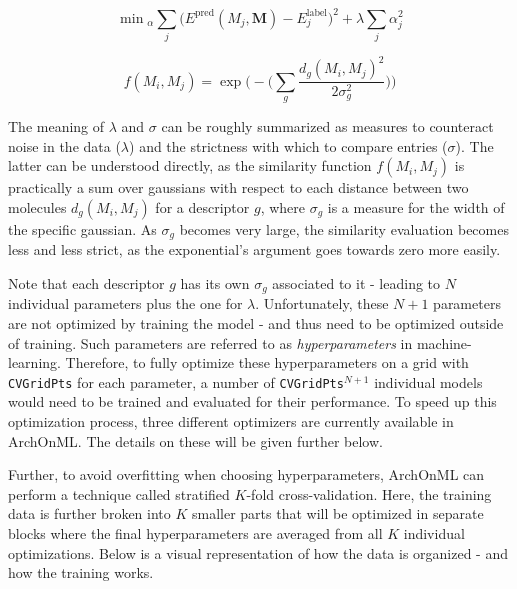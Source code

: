 \documentclass[12pt]{achemso}
\begin{document}
\begin{equation}
    \min \phantom{}_\alpha \sum\limits_{j} \big( E^\mathrm{pred}(M_j, \mathbf{M}) - E_j^\mathrm{label} \big)^2 + \lambda \sum\limits_{j} \alpha_j^2
\end{equation}

\begin{equation}
    f(M_i, M_j) = \exp \Bigg(-\Bigg( \sum\limits_{g} \frac{d_g(M_i, M_j)^2}{2 \sigma_g^2}\Bigg)\Bigg)
\end{equation}

\noindent The meaning of $\lambda$ and $\sigma$ can be roughly summarized as measures to counteract noise in the data ($\lambda$) and the strictness with which to compare entries ($\sigma$). The latter can be understood directly, as the similarity function $f(M_i, M_j)$ is practically a sum over gaussians with respect to each distance between two molecules $d_g(M_i, M_j)$ for a descriptor $g$, where $\sigma_g$ is a measure for the width of the specific gaussian. As $\sigma_g$ becomes very large, the similarity evaluation becomes less and less strict, as the exponential's argument goes towards zero more easily.

\noindent Note that each descriptor $g$ has its own $\sigma_g$ associated to it - leading to $N$ individual parameters plus the one for $\lambda$. Unfortunately, these $N+1$ parameters are not optimized by training the model - and thus need to be optimized outside of training. Such parameters are referred to as \textit{hyperparameters} in machine-learning. Therefore, to fully optimize these hyperparameters on a grid with \texttt{CVGridPts} for each parameter, a number of \texttt{CVGridPts}$^{N+1}$ individual models would need to be trained and evaluated for their performance. To speed up this optimization process, three different optimizers are currently available in ArchOnML. The details on these will be given further below. 

\noindent Further, to avoid overfitting when choosing hyperparameters, ArchOnML can perform a technique called stratified $K$-fold cross-validation. Here, the training data is further broken into $K$ smaller parts that will be optimized in separate blocks where the final  hyperparameters are averaged from all $K$ individual optimizations. Below is a visual representation of how the data is organized - and how the training works.
\end{document}
